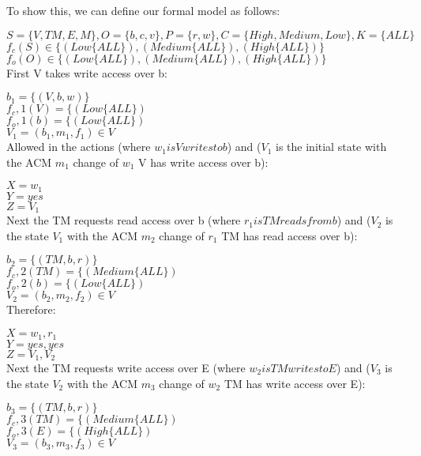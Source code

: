 \documentclass[journal,onecolumn]{IEEEtran}
\begin{document}
\begin{enumerate}
\begin{enumerate}
      To show this, we can define our formal model as follows:

      $S = \{V, TM, E, M\}, O = \{b, c, v\}, P = \{r, w\}, C = \{High, Medium, Low\}, K = \{ALL\}$\\
      $f_c(S) \in \{(Low \{ALL\}), (Medium \{ALL\}), (High \{ALL\}) \}$\\
      $f_o(O) \in \{(Low \{ALL\}), (Medium \{ALL\}), (High \{ALL\}) \}$\\

      First V takes write access over b:

      $b_1=\{(V, b, w)\}$\\
      $f_c,1(V) = \{(Low \{ALL\})$\\
      $f_o,1(b) = \{(Low \{ALL\})$\\
      $V_1 = (b_1,m_1,f_1) \in V$\\

      Allowed in the actions (where $w_1 is V writes to b$) and ($V_1$ is the initial state with the ACM $m_1$ change of $w_1$ V has write access over b):

      $X = w_1$\\
      $Y = yes$\\
      $Z = V_1$\\

      Next the TM requests read access over b (where $r_1 is TM reads from b$) and ($V_2$ is the state $V_1$ with the ACM $m_2$ change of $r_1$ TM has read access over b):

      $b_2=\{(TM, b, r)\}$\\
      $f_c,2(TM) = \{(Medium \{ALL\})$\\
      $f_o,2(b) = \{(Low \{ALL\})$\\
      $V_2 = (b_2,m_2,f_2) \in V$\\

      Therefore:

      $X = w_1, r_1$\\
      $Y = yes, yes$\\
      $Z = V_1, V_2$\\

      Next the TM requests write access over E (where $w_2 is TM writes to E$) and ($V_3$ is the state $V_2$ with the ACM $m_3$ change of $w_2$ TM has write access over E):

      $b_3=\{(TM, b, r)\}$\\
      $f_c,3(TM) = \{(Medium \{ALL\})$\\
      $f_o,3(E) = \{(High \{ALL\})$\\
      $V_3 = (b_3,m_3,f_3) \in V$\\


\end{enumerate}
\end{enumerate}
\end{document}
